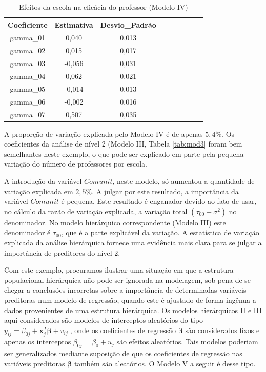 \documentclass[]{book}
\theoremstyle{definition}
\theoremstyle{definition}
\theoremstyle{definition}
\theoremstyle{remark}
\begin{document}
\begin{table}

\caption{\label{tab:mod4}Efeitos da escola na eficácia do professor (Modelo IV)}
\centering
\begin{tabular}[t]{ccccccccc}
\toprule
Coeficiente & Estimativa & Desvio\_Padrão\\
\midrule
gamma\_01 & 0,040 & 0,013\\
gamma\_02 & 0,015 & 0,017\\
gamma\_03 & -0,056 & 0,031\\
gamma\_04 & 0,062 & 0,021\\
gamma\_05 & -0,014 & 0,013\\
\addlinespace
gamma\_06 & -0,002 & 0,016\\
gamma\_07 & 0,507 & 0,035\\
\bottomrule
\end{tabular}
\end{table}

A proporção de variação explicada pelo Modelo IV é de apenas \(5,4\%\).
Os coeficientes da análise de nível 2 (Modelo III, Tabela \ref{tab:mod3}
foram bem semelhantes neste exemplo, o que pode ser explicado em parte
pela pequena variação do número de professores por escola.

A introdução da variável \(Comunit\), neste modelo, só aumentou a
quantidade de variação explicada em \(2,5\%\). A julgar por este
resultado, a importância da variável \(Comunit\) é pequena. Este
resultado é enganador devido ao fato de usar, no cálculo da razão de
variação explicada, a variação total
\(\left( \tau _{00}+\sigma ^{2}\right)\) no denominador. No modelo
hierárquico correspondente (Modelo III) este denominador é
\(\tau_{00}\), que é a parte explicável da variação. A estatística de
variação explicada da análise hierárquica fornece uma evidência mais
clara para se julgar a importância de preditores do nível 2.

Com este exemplo, procuramos ilustrar uma situação em que a estrutura
populacional hierárquica não pode ser ignorada na modelagem, sob pena de
se chegar a conclusões incorretas sobre a importância de determinadas
variáveis preditoras num modelo de regressão, quando este é ajustado de
forma ingênua a dados provenientes de uma estrutura hierárquica. Os
modelos hierárquicos II e III aqui considerados são modelos de
interceptos aleatórios do tipo
\(y_{ij}=\beta _{0j}+\mathbf{x}_{j}^{T}\mathbf{\beta +}v_{ij}\;\), onde
os coeficientes de regressão \(\mathbf{\beta }\) são considerados fixos
e apenas os interceptos \(\beta _{0j}=\beta _{0}+u_{j}\) são efeitos
aleatórios. Tais modelos poderiam ser generalizados mediante suposição
de que os coeficientes de regressão nas variáveis preditoras
\(\mathbf{\beta}\) também são aleatórios. O Modelo V a seguir é desse
tipo.
\end{document}
